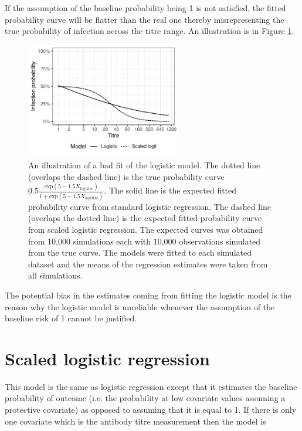 \documentclass[12pt]{article}
\begin{document}
If the assumption of the baseline probability being 1 is not satisfied, the fitted probability curve will be flatter than the real one thereby misrepresenting the true probability of infection across the titre range. An illustration is in Figure \ref{LogisticFit}.

\pagebreak

\begin{figure}[htp]
	\centering
	\includegraphics[width=0.6\textwidth]{../logistic-plot/lrex.pdf}
	\caption{
	An illustration of a bad fit of the logistic model. The dotted line (overlaps the dashed line) is the true probability curve $0.5\frac{\text{exp}(5 - 1.5 X_{\text{logtitre}})}{1 + \text{exp}(5 - 1.5 X_{\text{logtitre}})}$. The solid line is the expected fitted probability curve from standard logistic regression. The dashed line (overlaps the dotted line) is the expected fitted probability curve from scaled logistic regression. The expected curves was obtained from 10,000 simulations each with 10,000 observations simulated from the true curve. The models were fitted to each simulated dataset and the means of the regression estimates were taken from all simulations.
	}
	\label{LogisticFit}
\end{figure}

The potential bias in the estimates coming from fitting the logistic model is the reason why the logistic model is unreliable whenever the assumption of the baseline risk of 1 cannot be justified.

\pagebreak
\section{Scaled logistic regression}

This model is the same as logistic regression except that it estimates the baseline probability of outcome (i.e. the probability at low covariate values assuming a protective covariate) as opposed to assuming that it is equal to 1. If there is only one covariate which is the antibody titre measurement then the model is
\end{document}
